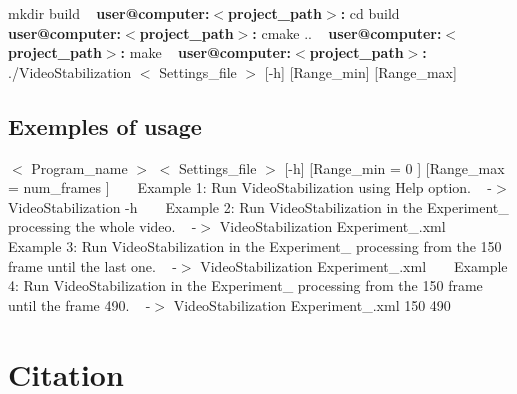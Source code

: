 { mkdir build ~\newline
{\bfseries user@computer\+:$<$project\+\_\+path$>$\+:} cd build ~\newline
{\bfseries user@computer\+:$<$project\+\_\+path$>$\+:} cmake .. ~\newline
{\bfseries user@computer\+:$<$project\+\_\+path$>$\+:} make ~\newline
{\bfseries user@computer\+:$<$project\+\_\+path$>$\+:} ./\+Video\+Stabilization $<$ Settings\+\_\+file $>$ \mbox{[}-\/h\mbox{]} \mbox{[}Range\+\_\+min\mbox{]} \mbox{[}Range\+\_\+max\mbox{]}~\newline
}\hypertarget{index_execution_sec}{}\subsection{Exemples of usage}\label{index_execution_sec}
{\ttfamily  $<$ Program\+\_\+name $>$ $<$ Settings\+\_\+file $>$ \mbox{[}-\/h\mbox{]} \mbox{[}Range\+\_\+min = 0 \mbox{]} \mbox{[}Range\+\_\+max = num\+\_\+frames \mbox{]} } ~\newline
~\newline
Example 1\+: Run Video\+Stabilization using Help option. ~\newline
{\ttfamily  -\/$>$ Video\+Stabilization -\/h } ~\newline
~\newline
Example 2\+: Run Video\+Stabilization in the Experiment\+\_ processing the whole video. ~\newline
{\ttfamily  -\/$>$ Video\+Stabilization Experiment\+\_.\+xml } ~\newline
~\newline
Example 3\+: Run Video\+Stabilization in the Experiment\+\_ processing from the 150 frame until the last one. ~\newline
{\ttfamily  -\/$>$ Video\+Stabilization Experiment\+\_.\+xml {} } ~\newline
~\newline
Example 4\+: Run Video\+Stabilization in the Experiment\+\_ processing from the 150 frame until the frame 490. ~\newline
{\ttfamily  -\/$>$ Video\+Stabilization Experiment\+\_.\+xml 150 490 } ~\newline
~\newline
 \hypertarget{index_citation_sec}{}\section{Citation}\label{index_citation_sec}
